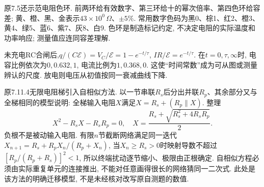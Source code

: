 原7.5还示范电阻色环. 前两环给有效数字、第三环给十的幂次倍率、第四色环给容差; 黄、橙、黑、金表示$43\times10^0\,\Omega$、$\pm5\%$. 常用数字色码为黑0、棕1、红2、橙3、黄4、绿5、蓝6、紫7、灰8、白9. 色环是制造标记约定, 不决定电阻的实际温度和功率响应; 测量值应连同容差理解.

未充电RC合闸后,$q/(C\mathcal E)=V_C/\mathcal E=1-e^{-t/\tau}$, $IR/\mathcal E=e^{-t/\tau}$. 在$t=0,\tau,\infty$时, 电容比例依次为$0,0.632,1$, 电流比例为$1,0.368,0$. 这使“时间常数”成为可从图或测量辨认的尺度. 放电则电压从初值按同一衰减曲线下降.
\begin{center}
\end{center}

原7.11.4无限电阻梯引入自相似方法. 以一节串联$R_s$后分出并联$R_p$、其余部分又与全梯相同的模型说明: 全梯输入电阻$X$满足$X=R_s+(R_p\parallel X)$. 整理
\[X^2-R_sX-R_sR_p=0,\quad X=\frac{R_s+\sqrt{R_s^2+4R_sR_p}}2.\]
负根不是被动输入电阻. 有限$n$节截断网络满足同一迭代$X_{n+1}=R_s+R_pX_n/(R_p+X_n)$, 当$X_n\ge R_s>0$时映射导数不超过$[R_p/(R_p+R_s)]^2<1$, 所以终端扰动逐节缩小、极限由正根确定. 自相似方程必须由实际重复单元的连接推出, 不能对任意画得很长的网络猜同一二次式. 此处是该方法的明确迁移模型, 不是未经核对改写原自测题的数值.
